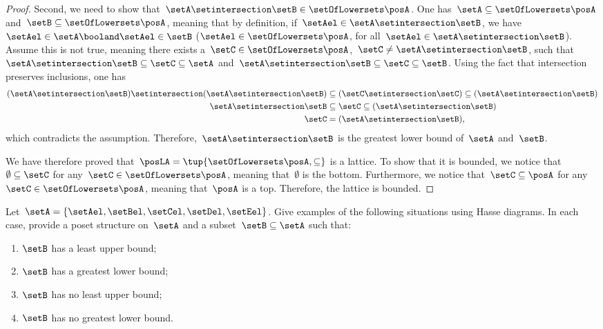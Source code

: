 \begin{proof}
    Second, we need to show that~$\setA \setintersection \setB\in \setOfLowersets \posA$.
    One has~$\setA \subseteq \setOfLowersets \posA$ and~$\setB\subseteq \setOfLowersets \posA$, meaning that by definition, if~$\setAel\in \setA\setintersection \setB$, we have~$\setAel \in \setA\booland \setAel\in \setB$ ($\setAel\in \setOfLowersets \posA$, for all~$\setAel\in \setA \setintersection \setB$).
    Assume this is not true, meaning there exists a~$\setC\in \setOfLowersets \posA$,~$\setC\neq \setA\setintersection \setB$, such that~$\setA\setintersection \setB\subseteq \setC\subseteq \setA$ and~$\setA\setintersection \setB\subseteq \setC\subseteq \setB$.
    Using the fact that intersection preserves inclusions, one has
    \begin{equation}
        \begin{aligned}
            (\setA\setintersection \setB)
            \setintersection (\setA\setintersection \setB) & \subseteq (\setC \setintersection \setC) \subseteq (\setA\setintersection \setB) \\
            \setA\setintersection \setB                    & \subseteq \setC\subseteq (\setA\setintersection \setB)                           \\
            \setC                                          & =(\setA\setintersection \setB),
        \end{aligned}
    \end{equation}
    which contradicts the assumption.
    Therefore,~$\setA\setintersection \setB$ is the greatest lower bound of~$\setA$ and~$\setB$.

    We have therefore proved that~$\posLA=\tup{\setOfLowersets \posA,\subseteq}$ is a lattice.
    To show that it is bounded, we notice that~$\emptyset \subseteq \setC$ for any~$\setC\in \setOfLowersets \posA$, meaning that~$\emptyset$ is the bottom.
    Furthermore, we notice that~$\setC\subseteq \posA$ for any~$\setC\in \setOfLowersets \posA$, meaning that~$\posA$ is a top.
    Therefore, the lattice is bounded.
\end{proof}

\vfill

\begin{gradedexercise}
    \label{ex:UpperLowerBounds}
    Let~$\setA = \{\setAel, \setBel, \setCel, \setDel, \setEel \}$.
    Give examples of the following situations using Hasse diagrams.
    In each case, provide a poset structure on~$\setA$ and a subset~$\setB \subseteq \setA$ such that:
    \begin{enumerate}
        \item $\setB$ has a least upper bound;
        \item $\setB$ has a greatest lower bound;
        \item $\setB$ has no least upper bound;
        \item $\setB$ has no greatest lower bound.
    \end{enumerate}
\end{gradedexercise}

